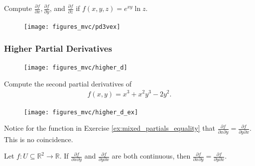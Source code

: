 \documentclass[12pt,letterpaper,reqno]{article}
\numberwithin{equation}{section}
\newcommand{\R}{\ensuremath{\mathbb R}}
\begin{document}
{\begin{exercise}
Compute $\frac{\partial f}{\partial x}, \frac{\partial f}{\partial y}$, and  $\frac{\partial f}{\partial z}$ if $f(x,y,z)=e^{xy}\ln z$. 	
\end{exercise}

\begin{figure}[h]
	\begin{center}
		\texttt{[image: figures\_mvc/pd3vex]}
	\end{center}
\end{figure}
\newpage 

\subsubsection{Higher Partial Derivatives}
\begin{figure}[h]
	\begin{center}
		\texttt{[image: figures\_mvc/higher\_d]}
	\end{center}
\end{figure}

\begin{exercise}\label{ex:mixed_partials_equality}
Compute the second partial derivatives of 
\begin{align*}
	f(x,y)=x^3+x^2y^3-2y^2.
\end{align*}	
\end{exercise}

\begin{figure}[h]
	\begin{center}
		\texttt{[image: figures\_mvc/higher\_d\_ex]}
	\end{center}
\end{figure}

Notice for the function in Exercise \ref{ex:mixed_partials_equality} that $\frac{\partial f}{\partial x \partial y}=\frac{\partial f}{\partial y \partial x}$. This is no coincidence.

\begin{thm}\label{thm:clairaut}
Let $f:U \subseteq \R^2 \to \R$. If $\frac{\partial f}{\partial x \partial y}$ and $\frac{\partial f}{\partial y \partial x}$	are both continuous, then $\frac{\partial f}{\partial x \partial y}=\frac{\partial f}{\partial y \partial x}$.
\end{thm}

}
\end{document}
